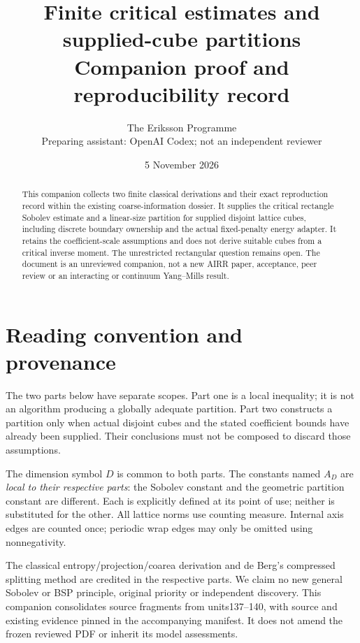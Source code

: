 \documentclass[11pt,a4paper]{article}
\title{Finite critical estimates and supplied-cube partitions\\\large Companion proof and reproducibility record}
\author{The Eriksson Programme\\\small Preparing assistant: OpenAI Codex; not an independent reviewer}
\date{5 November 2026}
\begin{document}
\maketitle
\begin{abstract}
This companion collects two finite classical derivations and their exact
reproduction record within the existing coarse-information dossier. It
supplies the critical rectangle Sobolev estimate and a linear-size
partition for supplied disjoint lattice cubes, including discrete boundary
ownership and the actual fixed-penalty energy adapter. It retains the
coefficient-scale assumptions and does not derive suitable cubes from a
critical inverse moment. The unrestricted rectangular question remains
open. The document is an unreviewed companion, not a new AIRR paper,
acceptance, peer review or an interacting or continuum Yang--Mills result.
\end{abstract}
\section*{Reading convention and provenance}
The two parts below have separate scopes. Part one is a local inequality;
it is not an algorithm producing a globally adequate partition. Part two
constructs a partition only when actual disjoint cubes and the stated
coefficient bounds have already been supplied. Their conclusions must not
be composed to discard those assumptions.

The dimension symbol $D$ is common to both parts. The constants named
$A_D$ are \emph{local to their respective parts}: the Sobolev constant
and the geometric partition constant are different. Each is explicitly
defined at its point of use; neither is substituted for the other.
All lattice norms use counting measure. Internal axis edges are counted
once; periodic wrap edges may only be omitted using nonnegativity.

The classical entropy/projection/coarea derivation and de Berg's compressed
splitting method are credited in the respective parts. We claim no new
general Sobolev or BSP principle, original priority or independent discovery.
This companion consolidates source fragments from units137--140, with
source and existing evidence pinned in the accompanying manifest. It does
not amend the frozen reviewed PDF or inherit its model assessments.
\clearpage
\tableofcontents
\clearpage

\clearpage

\clearpage
\end{document}
